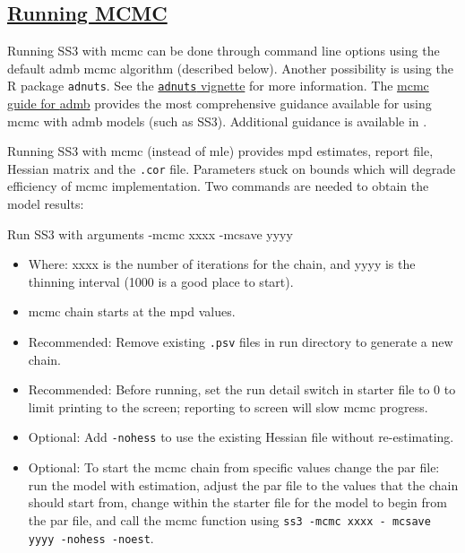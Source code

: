 \hypertarget{RunningMCMC}{}
\subsection[Running MCMC]{\protect\hyperlink{RunningMCMC}{Running MCMC}}
 Running SS3 with \gls{mcmc} can be done through command line options using the default \gls{admb} \gls{mcmc} algorithm (described below). Another possibility is using the R package \texttt{adnuts}. See the \href{https://cran.r-project.org/web/packages/adnuts/vignettes/adnuts.html}{\texttt{adnuts} vignette} for more information. The \href{https://www.admb-project.org/developers/mcmc/mcmc-guide-for-admb.pdf}{\gls{mcmc} guide for \gls{admb}} provides the most comprehensive guidance available for using \gls{mcmc} with \gls{admb} models (such as SS3). Additional guidance is available in \citep{monnahan2019overcoming}.

 Running SS3 with \gls{mcmc} (instead of \gls{mle}) provides \gls{mpd} estimates, report file, Hessian matrix and the \texttt{.cor} file. Parameters stuck on bounds which will degrade efficiency of \gls{mcmc} implementation. Two commands are needed to obtain the model results:
 
\noindent Run SS3 with arguments -mcmc xxxx -mcsave yyyy
 \begin{itemize}
 	\item Where: xxxx is the number of iterations for the chain, and yyyy is the thinning interval (1000 is a good place to start).
 	\item \gls{mcmc} chain starts at the \gls{mpd} values.
 	\item Recommended: Remove existing \texttt{.psv} files in run directory to generate a new chain.
 	\item Recommended: Before running, set the run detail switch in starter file to 0 to limit printing to the screen; reporting to screen will slow \gls{mcmc} progress.
 	\item Optional: Add \texttt{-nohess} to use the existing Hessian file without re-estimating.
 	\item Optional: To start the \gls{mcmc} chain from specific values change the par file: run the model with estimation, adjust the par file to the values that the chain should start from, change within the starter file for the model to begin from the par file, and call the \gls{mcmc} function using \texttt{ss3 -mcmc xxxx - mcsave yyyy -nohess -noest}.
 \end{itemize}
	
